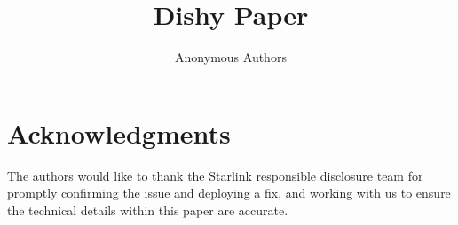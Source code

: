 \documentclass[conference]{IEEEtran}
\begin{document}
\title{Dishy Paper}

\author{Anonymous Authors}

\begin{comment}
\author{\IEEEauthorblockN{Joshua Smailes}
\IEEEauthorblockA{University of Oxford\\
joshua.smailes@cs.ox.ac.uk}
\and
\IEEEauthorblockN{Edd Salkield}
\IEEEauthorblockA{University of Oxford\\
edd.salkield@cs.ox.ac.uk}
\and
\IEEEauthorblockN{Simon Birnbach}
\IEEEauthorblockA{University of Oxford\\
simon.birnbach@cs.ox.ac.uk}
\and
\IEEEauthorblockN{Martin Strohmeier}
\IEEEauthorblockA{Cyber-Defence Campus, armasuisse Science + Technology\\
martin.strohmeier@armasuisse.ch}
\and
\IEEEauthorblockN{Ivan Martinovic}
\IEEEauthorblockA{University of Oxford\\
ivan.martinovic@cs.ox.ac.uk}}
\end{comment}

\begin{comment}
\IEEEoverridecommandlockouts
\makeatletter\def\@IEEEpubidpullup{6.5\baselineskip}\makeatother
\IEEEpubid{\parbox{\columnwidth}{
    Network and Distributed System Security (NDSS) Symposium 2023\\
    28 February - 4 March 2023, San Diego, CA, USA\\
    ISBN 1-891562-83-5\\
    https://dx.doi.org/10.14722/ndss.2023.23xxx\\
    www.ndss-symposium.org
}
\hspace{\columnsep}\makebox[\columnwidth]{}}
\end{comment}

\maketitle



\section*{Acknowledgments}

The authors would like to thank the Starlink responsible disclosure team for promptly confirming the issue and deploying a fix, and working with us to ensure the technical details within this paper are accurate.







\clearpage





\appendices



\end{document}
